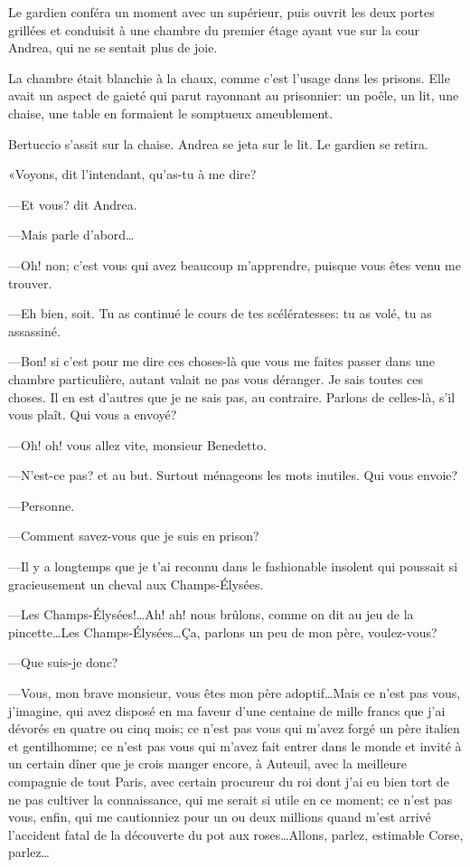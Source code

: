 Le gardien conféra un moment avec un supérieur, puis ouvrit les deux portes grillées et conduisit à une chambre du premier étage ayant vue sur la cour Andrea, qui ne se sentait plus de joie. 

La chambre était blanchie à la chaux, comme c'est l'usage dans les prisons. Elle avait un aspect de gaieté qui parut rayonnant au prisonnier: un poêle, un lit, une chaise, une table en formaient le somptueux ameublement. 

Bertuccio s'assit sur la chaise. Andrea se jeta sur le lit. Le gardien se retira. 

«Voyons, dit l'intendant, qu'as-tu à me dire? 

—Et vous? dit Andrea. 

—Mais parle d'abord\dots 

—Oh! non; c'est vous qui avez beaucoup m'apprendre, puisque vous êtes venu me trouver. 

—Eh bien, soit. Tu as continué le cours de tes scélératesses: tu as volé, tu as assassiné. 

—Bon! si c'est pour me dire ces choses-là que vous me faites passer dans une chambre particulière, autant valait ne pas vous déranger. Je sais toutes ces choses. Il en est d'autres que je ne sais pas, au contraire. Parlons de celles-là, s'il vous plaît. Qui vous a envoyé? 

—Oh! oh! vous allez vite, monsieur Benedetto. 

—N'est-ce pas? et au but. Surtout ménageons les mots inutiles. Qui vous envoie? 

—Personne. 

—Comment savez-vous que je suis en prison? 

—Il y a longtemps que je t'ai reconnu dans le fashionable insolent qui poussait si gracieusement un cheval aux Champs-Élysées. 

—Les Champs-Élysées!\dots Ah! ah! nous brûlons, comme on dit au jeu de la pincette\dots Les Champs-Élysées\dots Ça, parlons un peu de mon père, voulez-vous? 

—Que suis-je donc? 

—Vous, mon brave monsieur, vous êtes mon père adoptif\dots Mais ce n'est pas vous, j'imagine, qui avez disposé en ma faveur d'une centaine de mille francs que j'ai dévorés en quatre ou cinq mois; ce n'est pas vous qui m'avez forgé un père italien et gentilhomme; ce n'est pas vous qui m'avez fait entrer dans le monde et invité à un certain dîner que je crois manger encore, à Auteuil, avec la meilleure compagnie de tout Paris, avec certain procureur du roi dont j'ai eu bien tort de ne pas cultiver la connaissance, qui me serait si utile en ce moment; ce n'est pas vous, enfin, qui me cautionniez pour un ou deux millions quand m'est arrivé l'accident fatal de la découverte du pot aux roses\dots Allons, parlez, estimable Corse, parlez\dots 

